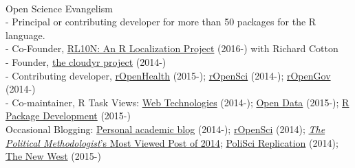 \documentclass[12pt]{article}
\newcommand{\topic}[1]{\pagebreak[3]\indent {\color{lg}{\footnotesize #1 }}\\}
\newcommand{\entry}[1]{\indent {\color{lg}\guillemotright}\hspace{2pt}#1\vspace{.25em}\\}
\newcommand{\subentry}[1]{{\color{lg}-} #1\vspace{.25em}\\}
\begin{document}
\topic{Public Engagement}
\entry{Open Science Evangelism}
	\subentry{Principal or contributing developer for more than 50 packages for the R language.}
	\subentry{Co-Founder, \href{http://rl10n.github.io/}{RL10N: An R Localization Project} (2016-) with Richard Cotton}
	\subentry{Founder, \href{http://cloudyr.github.io/}{the cloudyr project} (2014-)}
	\subentry{Contributing developer, \href{http://ropensci.org/}{rOpenHealth} (2015-); \href{http://ropensci.org/}{rOpenSci} (2014-); \href{http://ropengov.github.io/}{rOpenGov} (2014-)}
	\subentry{Co-maintainer, R Task Views:  \href{http://cran.r-project.org/web/views/WebTechnologies.html}{Web Technologies} (2014-); \href{https://www.github.com/ropensci/opendata}{Open Data} (2015-); \href{https://www.github.com/leeper/PackageDevelopment}{R Package Development} (2015-)}
\entry{Occasional Blogging: \href{http://thomasleeper.com/blog}{Personal academic blog} (2014-); \href{http://ropensci.org/blog/}{rOpenSci} (2014); \href{http://thepoliticalmethodologist.com/2015/01/05/introducing-the-annual-tpm-most-viewed-post-award-and-our-2014-winner/}{\textit{The Political Methodologist}'s Most Viewed Post of 2014}; \href{http://politicalsciencereplication.wordpress.com/}{PoliSci Replication} (2014); \href{https://thewpsa.wordpress.com/2015/05/09/what-can-we-learn-from-10-1-million-facebook-users-its-complicated/}{The New West} (2015-)}
\end{document}
